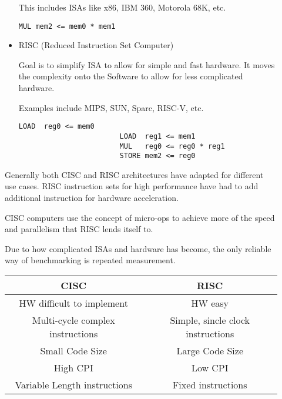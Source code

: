 \documentclass{report}
\begin{document}
\begin{description}
\begin{itemize}
                This includes ISAs like x86, IBM 360, Motorola 68K, etc.

                \begin{lstlisting}[language={[x86asm]Assembler}]
                        MUL mem2 <= mem0 * mem1
                \end{lstlisting}

            \item RISC (Reduced Instruction Set Computer)

                Goal is to simplify ISA to allow for simple and fast hardware. It moves
                the complexity onto the Software to allow for less complicated hardware.

                Examples include MIPS, SUN, Sparc, RISC-V, etc.
                \begin{lstlisting}[language={[x86asm]Assembler}]
                        LOAD  reg0 <= mem0
                        LOAD  reg1 <= mem1
                        MUL   reg0 <= reg0 * reg1
                        STORE mem2 <= reg0
                \end{lstlisting}
        \end{itemize}

        Generally both CISC and RISC architectures have adapted for different
        use cases. RISC instruction sets for high performance have had to add
        additional instruction for hardware acceleration.

        CISC computers use the concept of micro-ops to achieve more of the
        speed and parallelism that RISC lends itself to.

        Due to how complicated ISAs and hardware has become, the only reliable
        way of benchmarking is repeated measurement.


        \begin{tabular}{| c | c |}
            \hline
            CISC & RISC\\
            \hline
            HW difficult to implement & HW easy\\
            \hline
            Multi-cycle complex instructions & Simple, sincle clock instructions\\
            \hline
            Small Code Size & Large Code Size\\
            \hline
            High CPI & Low CPI\\
            \hline
            Variable Length instructions & Fixed instructions\\
            \hline
        \end{tabular}


\end{description}
\end{document}
